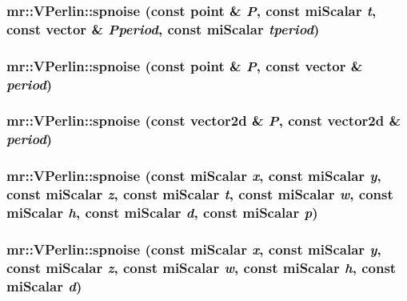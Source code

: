 \subsubsection{ mr::VPerlin::spnoise (const {\bf point} \& {\em P}, const mi\-Scalar {\em t}, const {\bf vector} \& {\em Pperiod}, const mi\-Scalar {\em tperiod})\hspace{0.3cm}{\tt  [inline, static]}}\label{classmr_1_1VPerlin_e27}


\subsubsection{ mr::VPerlin::spnoise (const {\bf point} \& {\em P}, const {\bf vector} \& {\em period})\hspace{0.3cm}{\tt  [inline, static]}}\label{classmr_1_1VPerlin_e26}


\subsubsection{ mr::VPerlin::spnoise (const {\bf vector2d} \& {\em P}, const {\bf vector2d} \& {\em period})\hspace{0.3cm}{\tt  [inline, static]}}\label{classmr_1_1VPerlin_e25}


\subsubsection{ mr::VPerlin::spnoise (const mi\-Scalar {\em x}, const mi\-Scalar {\em y}, const mi\-Scalar {\em z}, const mi\-Scalar {\em t}, const mi\-Scalar {\em w}, const mi\-Scalar {\em h}, const mi\-Scalar {\em d}, const mi\-Scalar {\em p})\hspace{0.3cm}{\tt  [inline, static]}}\label{classmr_1_1VPerlin_e24}


\subsubsection{ mr::VPerlin::spnoise (const mi\-Scalar {\em x}, const mi\-Scalar {\em y}, const mi\-Scalar {\em z}, const mi\-Scalar {\em w}, const mi\-Scalar {\em h}, const mi\-Scalar {\em d})\hspace{0.3cm}{\tt  [inline, static]}}\label{classmr_1_1VPerlin_e23}



